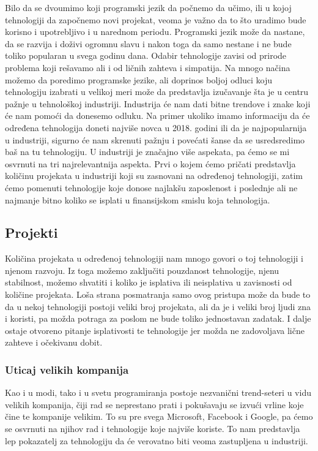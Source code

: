 \documentclass[a4paper]{article}
\begin{document}
Bilo da se dvoumimo koji programski jezik da počnemo da učimo, ili u kojoj tehnologiji da započnemo novi projekat, veoma je važno da to što uradimo bude korisno i upotrebljivo i u narednom periodu. Programski jezik može da nastane, da se razvija i doživi ogromnu slavu i nakon toga da samo nestane i ne bude toliko popularan u svega godinu dana. Odabir tehnologije zavisi od prirode problema koji rešavamo ali i od ličnih zahteva i simpatija. Na mnogo načina možemo da poredimo programske jezike, ali doprinos boljoj odluci koju tehnologiju izabrati u velikoj meri može da predstavlja izučavanje šta je u centru pažnje u tehnološkoj industriji. Industrija će nam dati bitne trendove i znake koji će nam pomoći da donesemo odluku. Na primer ukoliko imamo informaciju da će određena tehnologija doneti najviše novca u 2018. godini ili da je najpopularnija u industriji, sigurno će nam skrenuti pažnju i povećati šanse da se usredsredimo baš na tu tehnologiju. U industriji je značajno više aspekata, pa ćemo se mi osvrnuti na tri najrelevantnija aspekta. Prvi o kojem ćemo pričati predstavlja količinu projekata u industriji koji su zasnovani na određenoj tehnologiji, zatim ćemo pomenuti tehnologije koje donose najlakšu zaposlenost i poslednje ali ne najmanje bitno koliko se isplati u finansijskom smislu koja tehnologija.

\subsection{Projekti}
\label{subsec:projekti}
Količina projekata u određenoj tehnologiji nam mnogo govori o toj tehnologiji i njenom razvoju. Iz toga možemo zaključiti pouzdanost tehnologije, njenu stabilnost, možemo shvatiti i koliko je isplativa ili neisplativa u zavisnosti od količine projekata. Loša strana posmatranja samo ovog pristupa može da bude to da u nekoj tehnologiji postoji veliki broj projekata, ali da je i veliki broj ljudi zna i koristi, pa možda potraga za poslom ne bude toliko jednostavan zadatak. I dalje ostaje otvoreno pitanje isplativosti te tehnologije jer možda ne zadovoljava lične zahteve i očekivanu dobit.

\subsubsection{Uticaj velikih kompanija}
\label{subsec:uticaj velikih kompanija}

Kao i u modi, tako i u svetu programiranja postoje nezvanični trend-seteri  u vidu velikih kompanija, čiji rad se neprestano prati i pokušavaju se izvući vrline koje čine te kompanije velikim. To su pre svega Microsoft, Facebook i Google, pa ćemo se osvrnuti na njihov rad i tehnologije koje najviše koriste. To nam predstavlja lep pokazatelj za tehnologiju da će verovatno biti veoma zastupljena u industriji.
\end{document}
